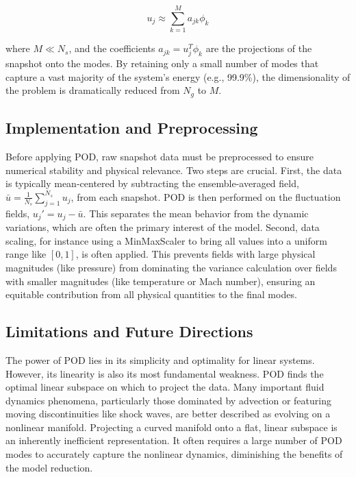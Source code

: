 $$u_j \approx \sum_{k=1}^{M} a_{jk} \phi_k$$

where $M \ll N_s$, and the coefficients $a_{jk} = u_j^T \phi_k$ are the projections of the snapshot onto the modes. By retaining only a small number of modes that capture a vast majority of the system's energy (e.g., 99.9\%), the dimensionality of the problem is dramatically reduced from $N_g$ to $M$.

\subsection{Implementation and Preprocessing}

Before applying POD, raw snapshot data must be preprocessed to ensure numerical stability and physical relevance. Two steps are crucial. First, the data is typically mean-centered by subtracting the ensemble-averaged field, $\bar{u} = \frac{1}{N_s}\sum_{j=1}^{N_s} u_j$, from each snapshot. POD is then performed on the fluctuation fields, $u_j' = u_j - \bar{u}$. This separates the mean behavior from the dynamic variations, which are often the primary interest of the model. Second, data scaling, for instance using a MinMaxScaler to bring all values into a uniform range like $[0, 1]$, is often applied. This prevents fields with large physical magnitudes (like pressure) from dominating the variance calculation over fields with smaller magnitudes (like temperature or Mach number), ensuring an equitable contribution from all physical quantities to the final modes.

\subsection{Limitations and Future Directions}

The power of POD lies in its simplicity and optimality for linear systems. However, its linearity is also its most fundamental weakness. POD finds the optimal linear subspace on which to project the data. Many important fluid dynamics phenomena, particularly those dominated by advection or featuring moving discontinuities like shock waves, are better described as evolving on a nonlinear manifold. Projecting a curved manifold onto a flat, linear subspace is an inherently inefficient representation. It often requires a large number of POD modes to accurately capture the nonlinear dynamics, diminishing the benefits of the model reduction. 

